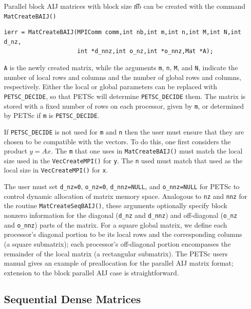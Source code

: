 Parallel block AIJ matrices with block size {\t nb} can be created with
the command \lstinline{MatCreateBAIJ()}
\begin{lstlisting}
ierr = MatCreateBAIJ(MPIComm comm,int nb,int m,int n,int M,int N,int d_nz,
                     int *d_nnz,int o_nz,int *o_nnz,Mat *A);
\end{lstlisting}
\lstinline{A} is the newly created matrix, while the arguments \lstinline{m}, \lstinline{n},
\lstinline{M}, and \lstinline{N}, indicate the number of local rows and columns and
the number of global rows and columns, respectively. Either the local or
global parameters can be replaced with \lstinline{PETSC_DECIDE}, so that
PETSc will determine \lstinline{PETSC_DECIDE} them.
The matrix is stored with a fixed number of rows on
each processor, given by \lstinline{m}, or determined by PETSc if \lstinline{m} is
\lstinline{PETSC_DECIDE}.

If \lstinline{PETSC_DECIDE} is not used for
\lstinline{m} and \lstinline{n} then the user must ensure that they are chosen to be
compatible with the vectors. To do this, one first considers the product
$y = A x$. The \lstinline{m} that one uses in \lstinline{MatCreateBAIJ()}
must match the local size used in the \lstinline{VecCreateMPI()} for \lstinline{y}.
The \lstinline{n} used must match that used as the local size in
\lstinline{VecCreateMPI()} for \lstinline{x}.

The user must set \lstinline{d_nz=0}, \lstinline{o_nz=0}, \lstinline{d_nnz=NULL}, and
\lstinline{o_nnz=NULL} for PETSc to control dynamic allocation of matrix
memory space.  Analogous to \lstinline{nz} and \lstinline{nnz} for the routine
\lstinline{MatCreateSeqBAIJ()}, these arguments optionally specify
block nonzero information for the diagonal (\lstinline{d_nz} and \lstinline{d_nnz}) and
off-diagonal (\lstinline{o_nz} and \lstinline{o_nnz}) parts of the matrix.
For a square global matrix, we define each processor's diagonal portion
to be its local rows and the corresponding columns (a square submatrix);
each processor's off-diagonal portion encompasses the remainder of the
local matrix (a rectangular submatrix).
The PETSc users manual gives an example of preallocation for
the parallel AIJ matrix format; extension to the block parallel AIJ case
is straightforward.

\subsection{Sequential Dense Matrices}

